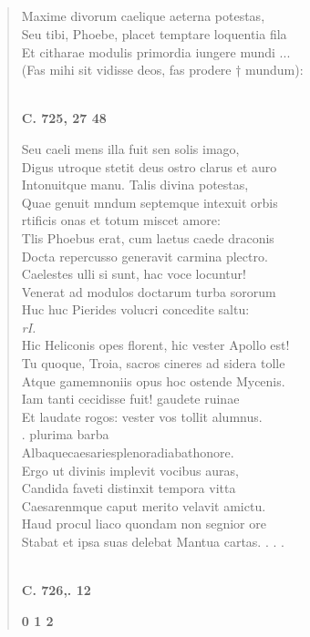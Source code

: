 \documentclass[11pt, a4paper]{report}
\begin{document}
            \subsection*{}
      \begin{verse}
      Maxime divorum caelique aeterna potestas, \\ Seu tibi, Phoebe, placet temptare loquentia fila \\ Et citharae modulis primordia iungere mundi ... \\ (Fas mihi sit vidisse deos, fas prodere † mundum): \\ 
        ﻿\pagebreak 
     \marginpar{[212]} \begin{center} \textbf{C. 725, 27 48} \end{center}Seu caeli mens illa fuit sen solis imago, \\ Digus utroque stetit  \lbrack deus \rbrack  ostro clarus et auro \\ Intonuitque manu. Talis divina potestas, \\ Quae genuit mndum septemque intexuit orbis \\ rtificis onas et totum miscet amore: \\ Tlis Phoebus erat, cum laetus caede draconis \\ Docta repercusso generavit carmina plectro. \\ Caelestes ulli si sunt, hac voce locuntur! \\ Venerat ad modulos doctarum turba sororum \\ Huc huc Pierides volucri concedite saltu: \\ \textit{rI.} \\ Hic Heliconis opes florent, hic vester Apollo est! \\ Tu quoque, Troia, sacros cineres ad sidera tolle \\ Atque gamemnoniis opus hoc ostende Mycenis. \\ Iam tanti cecidisse fuit! gaudete ruinae \\ Et laudate rogos: vester vos tollit alumnus. \\ . plurima barba \\ Albaquecaesariesplenoradiabathonore. \\ Ergo ut divinis implevit vocibus auras, \\ Candida faveti distinxit tempora vitta \\ Caesarenmque caput merito velavit amictu. \\ Haud procul liaco quondam non segnior ore \\ Stabat et ipsa suas delebat Mantua cartas. . . . \\ 
        ﻿\pagebreak 
    \begin{center} \textbf{C. 726,. 12} \end{center}\begin{center} \textbf{0 1 2} \end{center}
      \end{verse}
  
\end{document}
